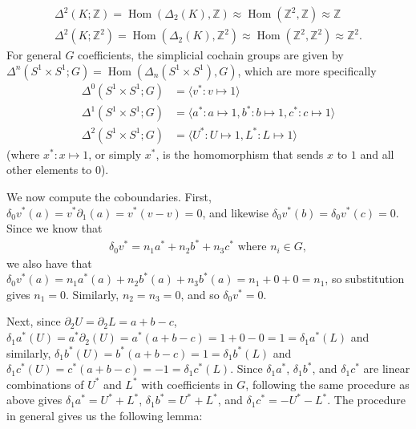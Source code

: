 \documentclass[12pt]{article}
\DeclareMathOperator{\Hom}{Hom}
\newcommand{\iso}{\approx}
\begin{document}
\begin{enumerate}
\begin{enumerate}
\begin{gather*}
                        \Delta^2(K; \mathbb{Z}) = \Hom(\Delta_2(K), \mathbb{Z}) \iso \Hom(\mathbb{Z}^2, \mathbb{Z}) \iso \mathbb{Z} \\
                        \Delta^2(K; \mathbb{Z}^2) = \Hom(\Delta_2(K), \mathbb{Z}^2) \iso \Hom(\mathbb{Z}^2, \mathbb{Z}^2) \iso \mathbb{Z}^2.
                    \end{gather*}
                \fi
                For general $G$ coefficients, the simplicial cochain groups are given by $\Delta^n(S^1 \times S^1; G) = \Hom(\Delta_n(S^1 \times S^1), G)$, which are more specifically
                \begin{align*}
                    \Delta^0(S^1 \times S^1; G) &= \langle v^* : v \mapsto 1 \rangle \\
                    \Delta^1(S^1 \times S^1; G) &= \langle a^* : a \mapsto 1, b^* : b \mapsto 1, c^* : c \mapsto 1 \rangle \\
                    \Delta^2(S^1 \times S^1; G) &= \langle U^* : U \mapsto 1, L^* : L \mapsto 1 \rangle
                \end{align*}
                (where $x^* : x \mapsto 1$, or simply $x^*$, is the homomorphism that sends $x$ to $1$ and all other elements to $0$). \par
                We now compute the coboundaries. First, $\delta_0 v^*(a) = v^* \partial_1(a) = v^*(v - v) = 0$, and likewise $\delta_0 v^*(b) = \delta_0 v^*(c) = 0$. Since we know that
                \begin{align*}
                    \delta_0 v^* = n_1 a^* + n_2 b^* + n_3 c^* \text{ where $n_i \in G$},
                \end{align*}
                we also have that $\delta_0 v^*(a) = n_1 a^*(a) + n_2 b^*(a) + n_3 b^*(a) = n_1 + 0 + 0 = n_1$, so substitution gives $n_1 = 0$. Similarly, $n_2 = n_3 = 0$, and so $\delta_0 v^* = 0$. \par
                Next, since $\partial_2 U = \partial_2 L = a + b - c$, $\delta_1 a^*(U) = a^* \partial_2(U) = a^*(a + b - c) = 1 + 0 - 0 = 1 = \delta_1 a^*(L)$ and similarly, $\delta_1 b^*(U) = b^*(a + b - c) = 1 = \delta_1 b^*(L)$ and $\delta_1 c^*(U) = c^*(a + b - c) = -1 = \delta_1 c^*(L)$. Since $\delta_1 a^*$, $\delta_1 b^*$, and $\delta_1 c^*$ are linear combinations of $U^*$ and $L^*$ with coefficients in $G$, following the same procedure as above gives $\delta_1 a^* = U^* + L^*$, $\delta_1 b^* = U^* + L^*$, and $\delta_1 c^* = -U^* - L^*$. The procedure in general gives us the following lemma:

\end{enumerate}
\end{enumerate}
\end{document}

